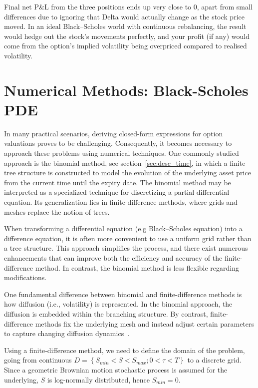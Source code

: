     Final net P\&L from the three positions ends up very close to $0$,
    apart from small differences due to ignoring that Delta would actually change as the stock price moved.
    In an ideal Black–Scholes world with continuous rebalancing,
    the result would hedge out the stock’s movements perfectly,
    and your profit (if any) would come from the option’s implied volatility being overpriced compared to
    realised volatility.

\section{Numerical Methods: Black-Scholes PDE}
    \label{sec:pde}

    In many practical scenarios, deriving closed-form expressions for option valuations proves
    to be challenging. Consequently, it becomes necessary to approach these problems using
    numerical techniques. One commonly studied approach is the binomial method, see section~\ref{sec:desc_time},
    in which a finite tree structure is constructed to model the evolution of the underlying asset price
    from the current time until the expiry date. The binomial method may be interpreted as
    a specialized technique for discretizing a partial differential equation. Its generalization
    lies in finite-difference methods, where grids and meshes replace the notion of trees.

    When transforming a differential equation (e.g Black–Scholes equation) into
    a difference equation, it is often more convenient to use a uniform grid rather than a
    tree structure. This approach simplifies the process, and there exist numerous enhancements
    that can improve both the efficiency and accuracy of the finite-difference method. In contrast,
    the binomial method is less flexible regarding modifications.

    One fundamental difference between binomial and finite-difference methods is how
    diffusion (i.e., volatility) is represented. In the binomial approach, the diffusion is
    embedded within the branching structure. By contrast, finite-difference methods fix the
    underlying mesh and instead adjust certain parameters to capture changing diffusion
    dynamics~\cite{wilmott_paul_2006}.

    Using a finite-difference method, we need to define the domain of the problem,
    going from continuous $D = \left\{S_{min} < S < S_{max}; 0 < \tau < T \right\}$ to a discrete grid.
    Since a geometric Brownian motion stochastic process is assumed for the underlying, $S$ is log-normally distributed,
    hence $S_{min} = 0$.

